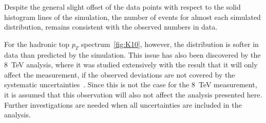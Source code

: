  Despite the general slight offset of the data points with respect to the solid histogram lines of the simulation, the number of events for almost each simulated distribution, remains consistent with the observed numbers in data.

 For the hadronic top $p_T$ spectrum~\cref{fig:K10}, however, the distribution is softer in data than predicted by the simulation. This issue has also been discovered by the 8~TeV analysis, where it was studied extensively with the result that it will only affect the measurement, if the observed deviations are not covered by the systematic uncertainties~\cite{ATLAS-CONF-2017-071}. Since this is not the case for the 8~TeV measurement, it is assumed that this observation will also not affect the analysis presented here. Further investigations are needed when all  uncertainties are included in the analysis. 




 











